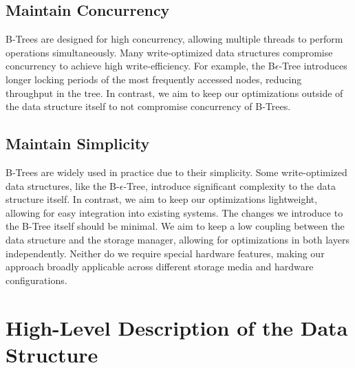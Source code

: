 \subsection*{Maintain Concurrency}
B-Trees are designed for high concurrency, allowing multiple threads to perform operations simultaneously.
Many write-optimized data structures compromise concurrency to achieve high write-efficiency.
For example, the B$\epsilon$-Tree introduces longer locking periods of the most frequently accessed nodes, reducing throughput in the tree.
In contrast, we aim to keep our optimizations outside of the data structure itself to not compromise concurrency of B-Trees.

\subsection*{Maintain Simplicity}
B-Trees are widely used in practice due to their simplicity.
Some write-optimized data structures, like the B-$\epsilon$-Tree, introduce significant complexity to the data structure itself.
In contrast, we aim to keep our optimizations lightweight, allowing for easy integration into existing systems.
The changes we introduce to the B-Tree itself should be minimal.
We aim to keep a low coupling between the data structure and the storage manager, allowing for optimizations in both layers independently.
Neither do we require special hardware features, making our approach broadly applicable across different storage media and hardware configurations.



\section{High-Level Description of the Data Structure}

